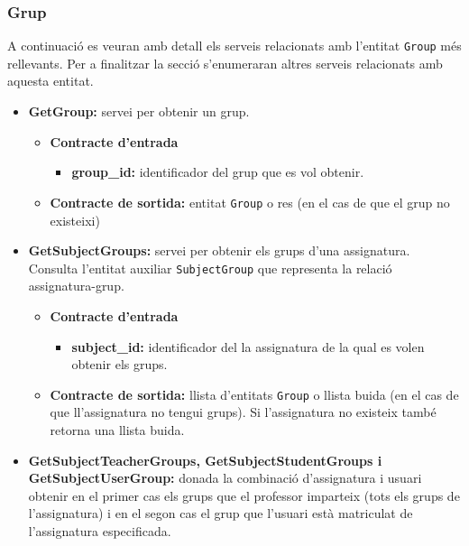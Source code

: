 		
		\subsubsection{Grup}
		A continuació es veuran amb detall els serveis relacionats amb l'entitat \texttt{Group} més rellevants. Per a finalitzar la secció s'enumeraran altres serveis relacionats amb aquesta entitat.
		
		\begin{itemize}
			\item \textbf{GetGroup:} servei per obtenir un grup.
			
				\begin{itemize}
					\item \textbf{Contracte d'entrada}
						\begin{itemize}
							\item \textbf{group\_id:} identificador del grup que es vol obtenir.
						\end{itemize}
					\item \textbf{Contracte de sortida:} entitat \texttt{Group} o res (en el cas de que el grup no existeixi)
				\end{itemize}
			\item \textbf{GetSubjectGroups:} servei per obtenir els grups d'una assignatura. Consulta l'entitat auxiliar \texttt{SubjectGroup} que representa la relació assignatura-grup.
				\begin{itemize}
					\item \textbf{Contracte d'entrada}
						\begin{itemize}
							\item \textbf{subject\_id:} identificador del la assignatura de la qual es volen obtenir els grups.
						\end{itemize}
					\item \textbf{Contracte de sortida:} llista d'entitats \texttt{Group} o llista buida (en el cas de que ll'assignatura no tengui grups). Si l'assignatura no existeix també retorna una llista buida.
				\end{itemize}
			
			
			\item \textbf{GetSubjectTeacherGroups, GetSubjectStudentGroups i GetSubjectUserGroup:} donada la combinació d'assignatura i usuari obtenir en el primer cas els grups que el professor imparteix (tots els grups de l'assignatura) i en el segon cas el grup que l'usuari està matriculat de l'assignatura especificada.\\
			

\end{itemize}
